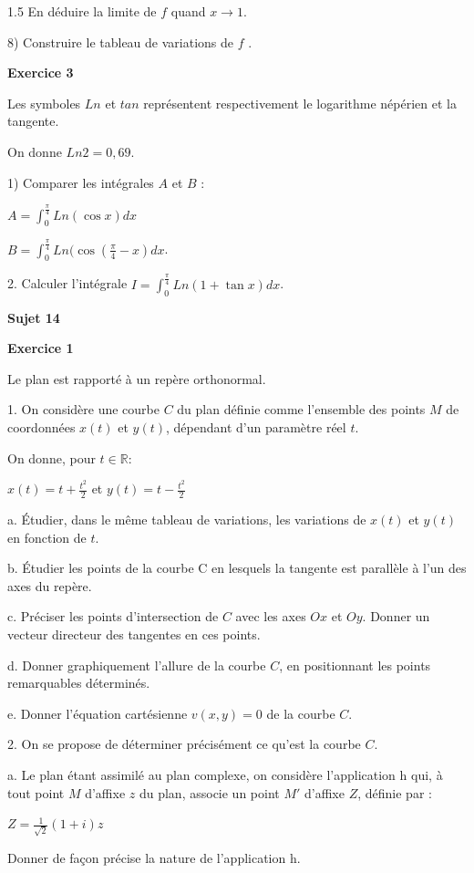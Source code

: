 \documentclass[12pt]{article}
\begin{document}
\begin{spacing}{1.5}
En déduire la limite de $f$ quand  $x \longrightarrow 1$. 

8) Construire le tableau de variations de $f$ . 

\medskip\textbf{Exercice 3}

Les symboles $Ln$ et $tan$ représentent respectivement le logarithme népérien et la tangente. 

On donne $Ln2 = 0,69$. 

1) Comparer les intégrales $A$ et $B$ :

$A=\int_{0}^{\frac{\pi}{4}}Ln(\cos x)dx$

$B= \int_{0}^{\frac{\pi}{4}}Ln(\cos(\frac{\pi}{4}- x)dx$.

2. Calculer l'intégrale $I=\int_{0}^{\frac{\pi}{4}}Ln(1+\tan x)dx$.

\medskip\textbf{Sujet 14}

\textbf{Exercice 1}

Le plan est rapporté à un repère orthonormal. 

1. On considère une courbe $C$ du plan définie comme l'ensemble des points $M$ de coordonnées $x(t)$ et $y(t)$, dépendant d'un paramètre réel $t$. 

On donne, pour $t\in \mathbb{R} $: 

$x(t)=t+\frac{t^2}{2}$ et $y(t)=t-\frac{t^2}{2}$

a. Étudier, dans le même tableau de variations, les variations de $x(t)$ et $y(t)$ en fonction de $t$. 

b. Étudier les points de la courbe C en lesquels la tangente est parallèle à l'un des axes du repère. 

c. Préciser les points d'intersection de $C$ avec les axes $Ox$ et $Oy$. Donner un vecteur 
directeur des tangentes en ces points. 

d. Donner graphiquement l'allure de la courbe $C$, en positionnant les points remarquables 
déterminés. 

e. Donner l'équation cartésienne $v(x, y) = 0$ de la courbe $C$. 

2. On se propose de déterminer précisément ce qu'est la courbe $C$. 

a. Le plan étant assimilé au plan complexe, on considère l'application h qui, à tout point $M$ 
d'affixe $z$ du plan, associe un point $M'$ d'affixe $Z$, définie par : 

$Z = \frac{1}{\sqrt{2}}(1+i)z$

 Donner de façon précise la nature de l'application h. 


\end{spacing}
\end{document}
